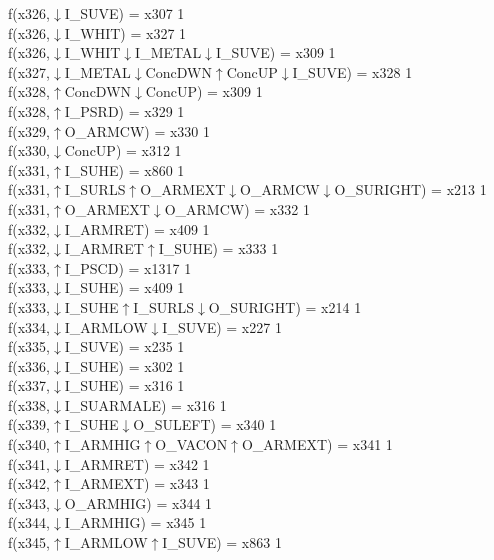 f(x326,$\downarrow$I\_SUVE) = x307 {1} \\
f(x326,$\downarrow$I\_WHIT) = x327 {1} \\
f(x326,$\downarrow$I\_WHIT$\downarrow$I\_METAL$\downarrow$I\_SUVE) = x309 {1} \\
f(x327,$\downarrow$I\_METAL$\downarrow$ConcDWN$\uparrow$ConcUP$\downarrow$I\_SUVE) = x328 {1} \\
f(x328,$\uparrow$ConcDWN$\downarrow$ConcUP) = x309 {1} \\
f(x328,$\uparrow$I\_PSRD) = x329 {1} \\
f(x329,$\uparrow$O\_ARMCW) = x330 {1} \\
f(x330,$\downarrow$ConcUP) = x312 {1} \\
f(x331,$\uparrow$I\_SUHE) = x860 {1} \\
f(x331,$\uparrow$I\_SURLS$\uparrow$O\_ARMEXT$\downarrow$O\_ARMCW$\downarrow$O\_SURIGHT) = x213 {1} \\
f(x331,$\uparrow$O\_ARMEXT$\downarrow$O\_ARMCW) = x332 {1} \\
f(x332,$\downarrow$I\_ARMRET) = x409 {1} \\
f(x332,$\downarrow$I\_ARMRET$\uparrow$I\_SUHE) = x333 {1} \\
f(x333,$\uparrow$I\_PSCD) = x1317 {1} \\
f(x333,$\downarrow$I\_SUHE) = x409 {1} \\
f(x333,$\downarrow$I\_SUHE$\uparrow$I\_SURLS$\downarrow$O\_SURIGHT) = x214 {1} \\
f(x334,$\downarrow$I\_ARMLOW$\downarrow$I\_SUVE) = x227 {1} \\
f(x335,$\downarrow$I\_SUVE) = x235 {1} \\
f(x336,$\downarrow$I\_SUHE) = x302 {1} \\
f(x337,$\downarrow$I\_SUHE) = x316 {1} \\
f(x338,$\downarrow$I\_SUARMALE) = x316 {1} \\
f(x339,$\uparrow$I\_SUHE$\downarrow$O\_SULEFT) = x340 {1} \\
f(x340,$\uparrow$I\_ARMHIG$\uparrow$O\_VACON$\uparrow$O\_ARMEXT) = x341 {1} \\
f(x341,$\downarrow$I\_ARMRET) = x342 {1} \\
f(x342,$\uparrow$I\_ARMEXT) = x343 {1} \\
f(x343,$\downarrow$O\_ARMHIG) = x344 {1} \\
f(x344,$\downarrow$I\_ARMHIG) = x345 {1} \\
f(x345,$\uparrow$I\_ARMLOW$\uparrow$I\_SUVE) = x863 {1} \\

